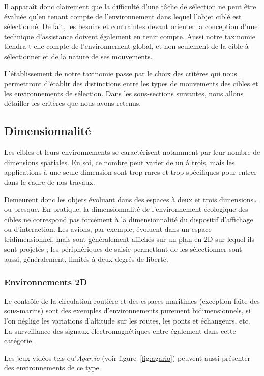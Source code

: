 	Il apparaît donc clairement que la difficulté d'une tâche de sélection ne peut être évaluée qu'en tenant compte de l'environnement dans lequel l'objet ciblé est sélectionné. De fait, les besoins et contraintes devant orienter la conception d'une technique d'assistance doivent également en tenir compte. Aussi notre taxinomie tiendra-t-elle compte de l'environnement global, et non seulement de la cible à sélectionner et de la nature de ses mouvements.


	L'établissement de notre taxinomie passe par le choix des critères qui nous permettront d'établir des distinctions entre les types de mouvements des cibles et les environnements de sélection. Dans les sous-sections suivantes, nous allons détailler les critères que nous avons retenus.
	
	\FloatBarrier \subsection{Dimensionnalité}
	Les cibles et leurs environnements se caractérisent notamment par leur nombre de dimensions spatiales. En soi, ce nombre peut varier de un à trois, mais les applications à une seule dimension sont trop rares et trop spécifiques pour entrer dans le cadre de nos travaux.
	
	Demeurent donc les objets évoluant dans des espaces à deux et trois dimensions\ldots{} ou presque. En pratique, la dimensionnalité de l'environnement \og écologique \fg{} des cibles ne correspond pas forcément à la dimensionnalité du dispositif d'affichage ou d'interaction. Les avions, par exemple, évoluent dans un espace tridimensionnel, mais sont généralement affichés sur un plan en 2D sur lequel ils sont projetés ; les périphériques de saisie permettant de les sélectionner sont aussi, généralement, limités à deux degrés de liberté.
	
	\FloatBarrier \subsubsection{Environnements 2D}
	Le contrôle de la circulation routière et des espaces maritimes (exception faite des sous-marins) sont des exemples d'environnements purement bidimensionnels, si l'on néglige les variations d'altitude sur les routes, les ponts et échangeurs, etc. La surveillance des signaux électromagnétiques entre également dans cette catégorie.
	
	Les jeux vidéos tels qu'\emph{Agar.io} (voir figure~\ref{fig:agario}) peuvent aussi présenter des environnements de ce type.
	
